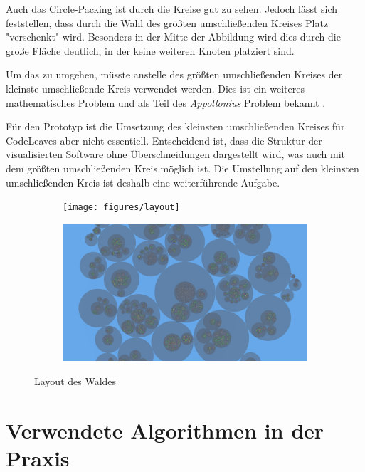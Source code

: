 Auch das Circle-Packing ist durch die Kreise gut zu sehen. Jedoch lässt sich feststellen, dass durch die Wahl des größten umschließenden Kreises Platz "verschenkt" wird. Besonders in der Mitte der Abbildung wird dies durch die große Fläche deutlich, in der keine weiteren Knoten platziert sind.

Um das zu umgehen, müsste anstelle des größten umschließenden Kreises der kleinste umschließende Kreis verwendet werden. Dies ist ein weiteres mathematisches Problem und als Teil des \textit{Appollonius} Problem bekannt \cite{dergiades2007soddy}.

Für den Prototyp ist die Umsetzung des kleinsten umschließenden Kreises für CodeLeaves aber nicht essentiell. Entscheidend ist, dass die Struktur der visualisierten Software ohne Überschneidungen dargestellt wird, was auch mit dem größten umschließenden Kreis möglich ist. Die Umstellung auf den kleinsten umschließenden Kreis ist deshalb eine weiterführende Aufgabe.

\begin{figure}[htbp]
  \centering
  \begin{subfigure}[t]{\textwidth}
    \centering
    \texttt{[image: figures/layout]}
     \label{fig:layout-side}
  \end{subfigure}
  \par\bigskip
  \begin{subfigure}[t]{\textwidth}
    \centering
  	\includegraphics[width=\textwidth]{figures/Circle-Packing}
  	 \label{fig:layout-top}
  \end{subfigure}
  \caption{Layout des Waldes} \label{fig:layout}
\end{figure}

\section{Verwendete Algorithmen in der Praxis}

